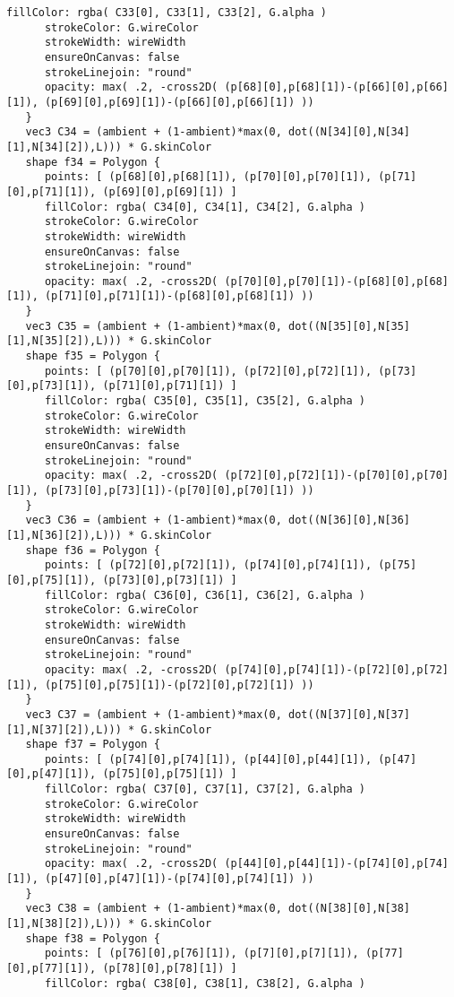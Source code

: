 \begin{lstlisting}[language=Sty-RT,escapechar=@]
      fillColor: rgba( C33[0], C33[1], C33[2], G.alpha )
      strokeColor: G.wireColor
      strokeWidth: wireWidth
      ensureOnCanvas: false
      strokeLinejoin: "round"
      opacity: max( .2, -cross2D( (p[68][0],p[68][1])-(p[66][0],p[66][1]), (p[69][0],p[69][1])-(p[66][0],p[66][1]) ))
   }
   vec3 C34 = (ambient + (1-ambient)*max(0, dot((N[34][0],N[34][1],N[34][2]),L))) * G.skinColor
   shape f34 = Polygon {
      points: [ (p[68][0],p[68][1]), (p[70][0],p[70][1]), (p[71][0],p[71][1]), (p[69][0],p[69][1]) ]
      fillColor: rgba( C34[0], C34[1], C34[2], G.alpha )
      strokeColor: G.wireColor
      strokeWidth: wireWidth
      ensureOnCanvas: false
      strokeLinejoin: "round"
      opacity: max( .2, -cross2D( (p[70][0],p[70][1])-(p[68][0],p[68][1]), (p[71][0],p[71][1])-(p[68][0],p[68][1]) ))
   }
   vec3 C35 = (ambient + (1-ambient)*max(0, dot((N[35][0],N[35][1],N[35][2]),L))) * G.skinColor
   shape f35 = Polygon {
      points: [ (p[70][0],p[70][1]), (p[72][0],p[72][1]), (p[73][0],p[73][1]), (p[71][0],p[71][1]) ]
      fillColor: rgba( C35[0], C35[1], C35[2], G.alpha )
      strokeColor: G.wireColor
      strokeWidth: wireWidth
      ensureOnCanvas: false
      strokeLinejoin: "round"
      opacity: max( .2, -cross2D( (p[72][0],p[72][1])-(p[70][0],p[70][1]), (p[73][0],p[73][1])-(p[70][0],p[70][1]) ))
   }
   vec3 C36 = (ambient + (1-ambient)*max(0, dot((N[36][0],N[36][1],N[36][2]),L))) * G.skinColor
   shape f36 = Polygon {
      points: [ (p[72][0],p[72][1]), (p[74][0],p[74][1]), (p[75][0],p[75][1]), (p[73][0],p[73][1]) ]
      fillColor: rgba( C36[0], C36[1], C36[2], G.alpha )
      strokeColor: G.wireColor
      strokeWidth: wireWidth
      ensureOnCanvas: false
      strokeLinejoin: "round"
      opacity: max( .2, -cross2D( (p[74][0],p[74][1])-(p[72][0],p[72][1]), (p[75][0],p[75][1])-(p[72][0],p[72][1]) ))
   }
   vec3 C37 = (ambient + (1-ambient)*max(0, dot((N[37][0],N[37][1],N[37][2]),L))) * G.skinColor
   shape f37 = Polygon {
      points: [ (p[74][0],p[74][1]), (p[44][0],p[44][1]), (p[47][0],p[47][1]), (p[75][0],p[75][1]) ]
      fillColor: rgba( C37[0], C37[1], C37[2], G.alpha )
      strokeColor: G.wireColor
      strokeWidth: wireWidth
      ensureOnCanvas: false
      strokeLinejoin: "round"
      opacity: max( .2, -cross2D( (p[44][0],p[44][1])-(p[74][0],p[74][1]), (p[47][0],p[47][1])-(p[74][0],p[74][1]) ))
   }
   vec3 C38 = (ambient + (1-ambient)*max(0, dot((N[38][0],N[38][1],N[38][2]),L))) * G.skinColor
   shape f38 = Polygon {
      points: [ (p[76][0],p[76][1]), (p[7][0],p[7][1]), (p[77][0],p[77][1]), (p[78][0],p[78][1]) ]
      fillColor: rgba( C38[0], C38[1], C38[2], G.alpha )

\end{lstlisting}
